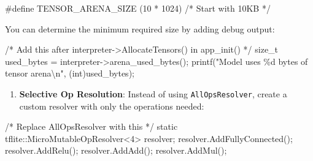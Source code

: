 \documentclass[
  9pt,
  letterpaper,
  abstract,
  titlepage]{scrbook}
\newenvironment{Shaded}{\begin{snugshade}}{\end{snugshade}}
\newcommand{\CommentTok}[1]{\textcolor[rgb]{0.37,0.37,0.37}{#1}}
\newcommand{\DataTypeTok}[1]{\textcolor[rgb]{0.68,0.00,0.00}{#1}}
\newcommand{\DecValTok}[1]{\textcolor[rgb]{0.68,0.00,0.00}{#1}}
\newcommand{\NormalTok}[1]{\textcolor[rgb]{0.00,0.23,0.31}{#1}}
\newcommand{\OperatorTok}[1]{\textcolor[rgb]{0.37,0.37,0.37}{#1}}
\newcommand{\PreprocessorTok}[1]{\textcolor[rgb]{0.68,0.00,0.00}{#1}}
\newcommand{\SpecialCharTok}[1]{\textcolor[rgb]{0.37,0.37,0.37}{#1}}
\newcommand{\StringTok}[1]{\textcolor[rgb]{0.13,0.47,0.30}{#1}}
\providecommand{\tightlist}{%
  \setlength{\itemsep}{0pt}\setlength{\parskip}{0pt}}\usepackage{longtable,booktabs,array}
\def\tightlist{}
\let\tightlist\relax
\begin{document}
\begin{Shaded}
\begin{Highlighting}[]
\PreprocessorTok{\#define TENSOR\_ARENA\_SIZE }\OperatorTok{(}\DecValTok{10}\PreprocessorTok{ }\OperatorTok{*}\PreprocessorTok{ }\DecValTok{1024}\OperatorTok{)}\PreprocessorTok{  }\CommentTok{/* Start with 10KB */}
\end{Highlighting}
\end{Shaded}

You can determine the minimum required size by adding debug output:

\begin{Shaded}
\begin{Highlighting}[]
\CommentTok{/* Add this after interpreter{-}\textgreater{}AllocateTensors() in app\_init() */}
\DataTypeTok{size\_t}\NormalTok{ used\_bytes }\OperatorTok{=}\NormalTok{ interpreter}\OperatorTok{{-}\textgreater{}}\NormalTok{arena\_used\_bytes}\OperatorTok{();}
\NormalTok{printf}\OperatorTok{(}\StringTok{"Model uses }\SpecialCharTok{\%d}\StringTok{ bytes of tensor arena}\SpecialCharTok{\textbackslash{}n}\StringTok{"}\OperatorTok{,} \OperatorTok{(}\DataTypeTok{int}\OperatorTok{)}\NormalTok{used\_bytes}\OperatorTok{);}
\end{Highlighting}
\end{Shaded}

\begin{enumerate}
\def\labelenumi{\arabic{enumi}.}
\setcounter{enumi}{1}
\tightlist
\item
  \textbf{Selective Op Resolution}: Instead of using
  \texttt{AllOpsResolver}, create a custom resolver with only the
  operations needed:
\end{enumerate}

\begin{Shaded}
\begin{Highlighting}[]
\CommentTok{/* Replace AllOpsResolver with this */}
\DataTypeTok{static}\NormalTok{ tflite}\OperatorTok{::}\NormalTok{MicroMutableOpResolver}\OperatorTok{\textless{}}\DecValTok{4}\OperatorTok{\textgreater{}}\NormalTok{ resolver}\OperatorTok{;}
\NormalTok{resolver}\OperatorTok{.}\NormalTok{AddFullyConnected}\OperatorTok{();}
\NormalTok{resolver}\OperatorTok{.}\NormalTok{AddRelu}\OperatorTok{();}
\NormalTok{resolver}\OperatorTok{.}\NormalTok{AddAdd}\OperatorTok{();}
\NormalTok{resolver}\OperatorTok{.}\NormalTok{AddMul}\OperatorTok{();}
\end{Highlighting}
\end{Shaded}
\end{document}
